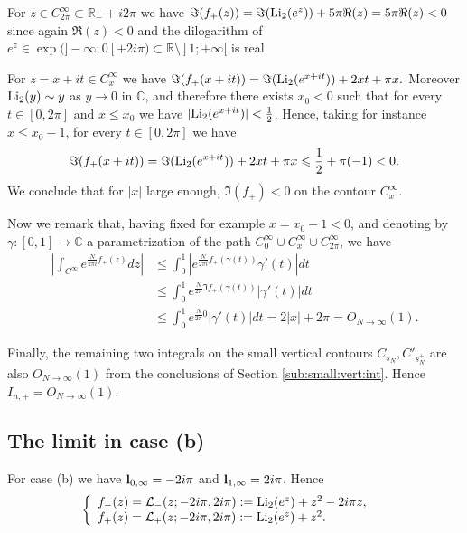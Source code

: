 \documentclass[11pt]{amsart}
\newcommand{\mc}{\mathbb{C}}
\newcommand{\R}{\mathbb{R}}
\newcommand{\bl}{{\bf l}}
\newcommand{\ra}{\rightarrow}
\begin{document}
{For $z \in C_{2\pi}^\infty \subset \R_-+ i2\pi$ we have $\Im(f_+(z))= \Im({\rm Li}_2(e^{z}))+5\pi\Re(z)=5\pi\Re(z) <0$ since again $\Re(z)<0$ and the dilogarithm of  $e^z \in \exp(]-\infty;0[ + 2i \pi) \subset \R\setminus ]1;+\infty[$ is real.

For $z=x+it \in C^\infty_x$ we have $\Im(f_+(x+it))= \Im({\rm Li}_2(e^{x+it}))+2 x t + \pi x.$ Moreover ${\rm Li}_2(y)\sim y$ as $y\ra 0$ in $\mc$, and 
 therefore there exists $x_0 <0$ such that
  for every $t\in [0,2\pi]$ and $x\leq x_0$ we have
  $\textstyle |{\rm Li}_2(e^{x+it})|<\frac{1}{2}$.
  Hence, taking for instance $x \leqslant x_0-1$, for every $t\in [0,2\pi]$ we have
$$\Im(f_+(x+it))= \Im({\rm Li}_2(e^{x+it}))+2 x t + \pi x
\leqslant \dfrac{1}{2} + \pi(-1) <0.
$$
We conclude that for $|x|$ large enough, $\Im(f_+)<0$ on the contour $C^\infty_x$.

Now we remark that, having fixed for example $x=x_0-1<0$, and denoting by $\gamma\colon [0,1]\to \mc$ a parametrization of the path $C^\infty_0 \cup C^\infty_x \cup C^\infty_{2\pi} $, we have
\begin{align*}
	\left \vert \int_{C^\infty} e^{\frac{N}{2\pi i}f_+(z)}dz\right \vert
& \leqslant \int_{0}^1 |e^{\frac{N}{2\pi i}f_+(\gamma(t))} \gamma'(t)|dt \\
& \leqslant \int_{0}^1 e^{\frac{N}{2\pi}\Im f_+(\gamma(t))} |\gamma'(t)| dt\\
& \leqslant \int_{0}^1 e^{\frac{N}{2\pi}0}|\gamma'(t)| dt=2|x|+2\pi = O_{N\ra \infty}(1).
\end{align*}

Finally, the remaining two integrals on the small vertical contours $C_{s_N^-}, C'_{s_N^+}$ are also $O_{N\ra \infty}(1)$ from the conclusions of Section \ref{sub:small:vert:int}. Hence $I_{n,+} = O_{N\ra \infty}(1)$.

\subsection{The limit in case (b)}\label{sub:SPM:b}
For case (b) we have $\bl_{0,\infty}=-2i\pi$ and $\bl_{1,\infty}=2i\pi$. Hence
\begin{equation}\label{defL+-modifcaseb}
	\left\lbrace
	\begin{array}{ll}
		f_-(z)= \mathcal{L}_-(z;-2i\pi,2i\pi) := {\rm Li}_2(e^{z})+z^2 - 2i\pi z,& 
		\\
		f_+(z) = \mathcal{L}_+(z;-2i\pi,2i\pi) := {\rm Li}_2(e^{z})+z^2.& 
	\end{array}\right.
\end{equation}

}
\end{document}
